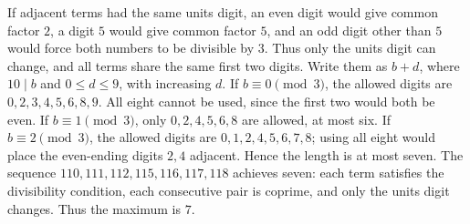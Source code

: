 If adjacent terms had the same units digit, an even digit would give common factor $2$, a digit $5$ would give common factor $5$, and an odd digit other than $5$ would force both numbers to be divisible by $3$. Thus only the units digit can change, and all terms share the same first two digits. Write them as $b+d$, where $10\mid b$ and $0\le d\le9$, with increasing $d$. If $b\equiv0\pmod3$, the allowed digits are $0,2,3,4,5,6,8,9$. All eight cannot be used, since the first two would both be even. If $b\equiv1\pmod3$, only $0,2,4,5,6,8$ are allowed, at most six. If $b\equiv2\pmod3$, the allowed digits are $0,1,2,4,5,6,7,8$; using all eight would place the even-ending digits $2,4$ adjacent. Hence the length is at most seven. The sequence $110,111,112,115,116,117,118$ achieves seven: each term satisfies the divisibility condition, each consecutive pair is coprime, and only the units digit changes. Thus the maximum is $\boxed7$.
